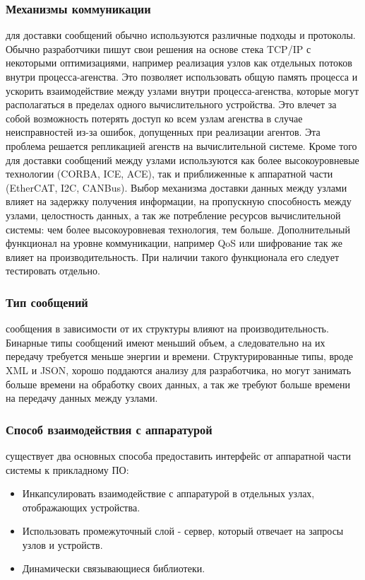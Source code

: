 \subsubsection{Механизмы коммуникации} для доставки сообщений обычно используются различные подходы и протоколы. Обычно разработчики пишут свои решения на основе стека TCP/IP с некоторыми оптимизациями, например реализация узлов как отдельных потоков внутри процесса-агенства. Это позволяет использовать общую память процесса и ускорить взаимодействие между узлами внутри процесса-агенства, которые могут располагаться в пределах одного вычислительного устройства. Это влечет за собой возможность потерять доступ ко всем узлам агенства в случае неисправностей из-за ошибок, допущенных при реализации агентов. Эта проблема решается репликацией агенств на вычислительной системе. Кроме того для доставки сообщений между узлами используются как более высокоуровневые технологии (CORBA, ICE, ACE), так и приближенные к аппаратной части (EtherCAT, I2C, CANBus). Выбор механизма доставки данных между узлами влияет на задержку получения информации, на пропускную способность между узлами, целостность данных, а так же потребление ресурсов вычислительной системы: чем более высокоуровневая технология, тем больше. Дополнительный функционал на уровне коммуникации, например QoS или шифрование так же влияет на производительность. При наличии такого функционала его следует тестировать отдельно.

\subsubsection{Тип сообщений} сообщения в зависимости от их структуры влияют на производительность. Бинарные типы сообщений имеют меньший объем, а следовательно на их передачу требуется меньше энергии и времени. Структурированные типы, вроде XML и JSON, хорошо поддаются анализу для разработчика, но могут занимать больше времени на обработку своих данных, а так же требуют больше времени на передачу данных между узлами.

\subsubsection{Способ взаимодействия с аппаратурой} существует два основных способа предоставить интерфейс от аппаратной части системы к прикладному ПО:
\begin{itemize}
	\item Инкапсулировать взаимодействие с аппаратурой в отдельных узлах, отображающих устройства.
	\item Использовать промежуточный слой - сервер, который отвечает на запросы узлов и устройств.
	\item Динамически связывающиеся библиотеки.
\end{itemize}

